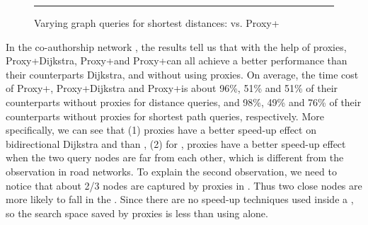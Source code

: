 \begin{figure}[t!]
\begin{center}
\end{center}
\vspace{1ex}
\caption{Varying graph queries  for shortest distances: \ah vs. Proxy+\ah}
\hrule
\label{fig:performance_dist_queries_ah}
\vspace{-1ex}
\end{figure}


In the co-authorship network \dblpone, the results tell us that with the help of proxies, Proxy+Dijkstra, Proxy+\arcflag and Proxy+\tnr can all achieve a better performance than their counterparts Dijkstra, \arcflag and \tnr without using proxies. On average, the time cost of Proxy+\arcflag, Proxy+Dijkstra and Proxy+\tnr is about 96\%, 51\% and 51\% of their counterparts without proxies for distance queries, and 98\%, 49\% and 76\% of their counterparts without proxies for shortest path queries, respectively. More specifically, we can see that (1) proxies have a better speed-up effect on bidirectional Dijkstra and \tnr than \arcflag, (2) for \arcflag, proxies have a better speed-up effect when the two query nodes are far from each other, which is different from the observation in road networks. To explain the second observation, we need to notice that about 2/3 nodes are captured by proxies in \dblpone. Thus two close nodes are more likely to fall in the \dras. Since there are no speed-up techniques used inside a \dra, so the search space saved by proxies is less than using \arcflag alone.

